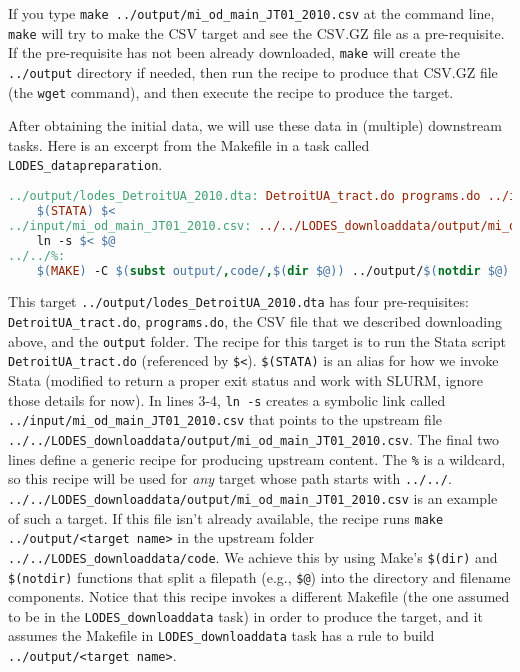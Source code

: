 If you type \texttt{make ../output/mi\_od\_main\_JT01\_2010.csv} at the command line, \texttt{make} will try to make the CSV target and see the CSV.GZ file as a pre-requisite.
If the pre-requisite has not been already downloaded, \texttt{make} will create the \texttt{../output} directory if needed,
then run the recipe to produce that CSV.GZ file (the \texttt{wget} command),
and then execute the recipe to produce the target.

After obtaining the initial data, we will use these data in (multiple) downstream tasks.
Here is an excerpt from the Makefile in a task called \texttt{LODES\_datapreparation}.
\begin{lstlisting}[language=make]
../output/lodes_DetroitUA_2010.dta: DetroitUA_tract.do programs.do ../input/mi_od_main_JT01_2010.csv | ../output
	$(STATA) $<
../input/mi_od_main_JT01_2010.csv: ../../LODES_downloaddata/output/mi_od_main_JT01_2010.csv | ../input
	ln -s $< $@
../../%:
	$(MAKE) -C $(subst output/,code/,$(dir $@)) ../output/$(notdir $@)
\end{lstlisting}
This target \texttt{../output/lodes\_DetroitUA\_2010.dta} has four pre-requisites:
\texttt{DetroitUA\_tract.do}, \texttt{programs.do}, the CSV file that we described downloading above, and the \texttt{output} folder.
The recipe for this target is to run the Stata script \texttt{DetroitUA\_tract.do} (referenced by \texttt{\$<}).
\texttt{\$(STATA)} is an alias for how we invoke Stata
(modified to return a proper exit status and work with SLURM, ignore those details for now).
In lines 3-4, \texttt{ln -s} creates a symbolic link called \texttt{../input/mi\_od\_main\_JT01\_2010.csv} that points to the upstream file
\texttt{../../LODES\_downloaddata/output/mi\_od\_main\_JT01\_2010.csv}.
The final two lines define a generic recipe for producing upstream content.
The \texttt{\%} is a wildcard, so this recipe will be used for \textit{any} target whose path starts with \texttt{../../}.
\texttt{../../LODES\_downloaddata/output/mi\_od\_main\_JT01\_2010.csv} is an example of such a target.
If this file isn't already available,
the recipe runs \texttt{make ../output/<target name>} in the upstream folder 
\texttt{../../LODES\_downloaddata/code}.
We achieve this by using Make's \texttt{\$(dir)} and \texttt{\$(notdir)} functions that split a filepath (e.g., \texttt{\$@}) into the directory and filename components.
Notice that this recipe invokes a different Makefile (the one assumed to be in the \texttt{LODES\_downloaddata} task)
in order to produce the target,
and it assumes the Makefile in \texttt{LODES\_downloaddata} task has a rule to build \texttt{../output/<target name>}.


